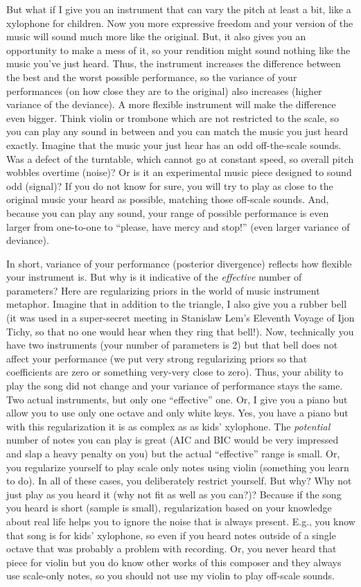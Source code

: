 \documentclass[
]{book}
\begin{document}
But what if I give you an instrument that can vary the pitch at least a bit, like a xylophone for children. Now you more expressive freedom and your version of the music will sound much more like the original. But, it also gives you an opportunity to make a mess of it, so your rendition might sound nothing like the music you've just heard. Thus, the instrument increases the difference between the best and the worst possible performance, so the variance of your performances (on how close they are to the original) also increases (higher variance of the deviance). A more flexible instrument will make the difference even bigger. Think violin or trombone which are not restricted to the scale, so you can play any sound in between and you can match the music you just heard exactly. Imagine that the music your just hear has an odd off-the-scale sounds. Was a defect of the turntable, which cannot go at constant speed, so overall pitch wobbles overtime (noise)? Or is it an experimental music piece designed to sound odd (signal)? If you do not know for sure, you will try to play as close to the original music your heard as possible, matching those off-scale sounds. And, because you can play any sound, your range of possible performance is even larger from one-to-one to ``please, have mercy and stop!'' (even larger variance of deviance).

In short, variance of your performance (posterior divergence) reflects how flexible your instrument is. But why is it indicative of the \emph{effective} number of parameters? Here are regularizing priors in the world of music instrument metaphor. Imagine that in addition to the triangle, I also give you a rubber bell (it was used in a super-secret meeting in Stanislaw Lem's Eleventh Voyage of Ijon Tichy, so that no one would hear when they ring that bell!). Now, technically you have two instruments (your number of parameters is 2) but that bell does not affect your performance (we put very strong regularizing priors so that coefficients are zero or something very-very close to zero). Thus, your ability to play the song did not change and your variance of performance stays the same. Two actual instruments, but only one ``effective'' one. Or, I give you a piano but allow you to use only one octave and only white keys. Yes, you have a piano but with this regularization it is as complex as as kids' xylophone. The \emph{potential} number of notes you can play is great (AIC and BIC would be very impressed and slap a heavy penalty on you) but the actual ``effective'' range is small. Or, you regularize yourself to play scale only notes using violin (something you learn to do). In all of these cases, you deliberately restrict yourself. But why? Why not just play as you heard it (why not fit as well as you can?)? Because if the song you heard is short (sample is small), regularization based on your knowledge about real life helps you to ignore the noise that is always present. E.g., you know that song is for kids' xylophone, so even if you heard notes outside of a single octave that was probably a problem with recording. Or, you never heard that piece for violin but you do know other works of this composer and they always use scale-only notes, so you should not use my violin to play off-scale sounds.
\end{document}
